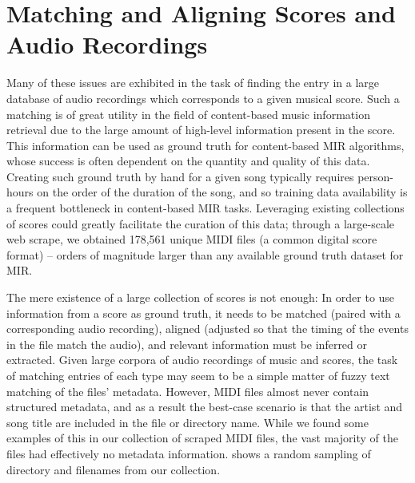 \section{Matching and Aligning Scores and Audio Recordings}
\label{sec:score_overview}

Many of these issues are exhibited in the task of finding the entry in a large database of audio recordings which corresponds to a given musical score.
Such a matching is of great utility in the field of content-based music information retrieval due to the large amount of high-level information present in the score.
This information can be used as ground truth for content-based MIR algorithms, whose success is often dependent on the quantity and quality of this data.
Creating such ground truth by hand for a given song typically requires person-hours on the order of the duration of the song, and so training data availability is a frequent bottleneck in content-based MIR tasks.
Leveraging existing collections of scores could greatly facilitate the curation of this data; through a large-scale web scrape, we obtained 178,561 unique MIDI files (a common digital score format) -- orders of magnitude larger than any available ground truth dataset for MIR.

The mere existence of a large collection of scores is not enough:  In order to use information from a score as ground truth, it needs to be matched (paired with a corresponding audio recording), aligned (adjusted so that the timing of the events in the file match the audio), and relevant information must be inferred or extracted.
Given large corpora of audio recordings of music and scores, the task of matching entries of each type may seem to be a simple matter of fuzzy text matching of the files' metadata.
However, MIDI files almost never contain structured metadata, and as a result the best-case scenario is that the artist and song title are included in the file or directory name.
While we found some examples of this in our collection of scraped MIDI files, the vast majority of the files had effectively no metadata information.
 shows a random sampling of directory and filenames from our collection.

